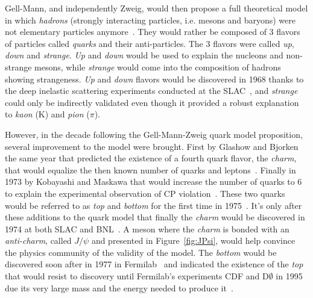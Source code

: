 	Gell-Mann, and independently Zweig, would then propose a full theoretical model in which \textit{hadrons} (strongly interacting particles, i.e. mesons and baryons) were not elementary particles anymore~\cite{GELLMANN1964,ZWEIG1964I,ZWEIG1964II}. They would rather be composed of 3 flavors of particles called \textit{quarks} and their anti-particles. The 3 flavors were called \textit{up}, \textit{down} and \textit{strange}. \textit{Up} and \textit{down} would be used to explain the nucleons and non-strange mesons, while \textit{strange} would come into the composition of hadrons showing strangeness. \textit{Up} and \textit{down} flavors would be discovered in 1968 thanks to the deep inelastic scattering experiments conducted at the \acf{SLAC}~\cite{BLOOM1969,BREIDENBACH1969}, and \textit{strange} could only be indirectly validated even though it provided a robust explanation to \textit{kaon} (K) and \textit{pion} ($\pi$).
	
	However, in the decade following the Gell-Mann-Zweig quark model proposition, several improvement to the model were brought. First by Glashow and Bjorken the same year that predicted the existence of a fourth quark flavor, the \textit{charm}, that would equalize the then known number of quarks and leptons~\cite{BJORKEN1964,GLASHOW1970}. Finally in 1973 by Kobayashi and Maskawa that would increase the number of quarks to 6 to explain the experimental observation of CP violation~\cite{CHRISTENSON1964,KOBAYASHI1973}. These two quarks would be referred to as \textit{top} and \textit{bottom} for the first time in 1975~\cite{HARARI1975}. It's only after these additions to the quark model that finally the \textit{charm} would be discovered in 1974 at both SLAC and \acf{BNL}~\cite{RICHTER1974,TING1974}. A meson where the \textit{charm} is bonded with an \textit{anti-charm}, called $J/\psi$ and presented in Figure~\ref{fig:JPsi}, would help convince the physics community of the validity of the model. The \textit{bottom} would be discovered soon after in 1977 in Fermilab~\cite{HERB1977} and indicated the existence of the \textit{top} that would resist to discovery until Fermilab's experiments CDF and D$\emptyset$ in 1995 due its very large mass and the energy needed to produce it~\cite{ABASHI1995,ABE1995}.
	
